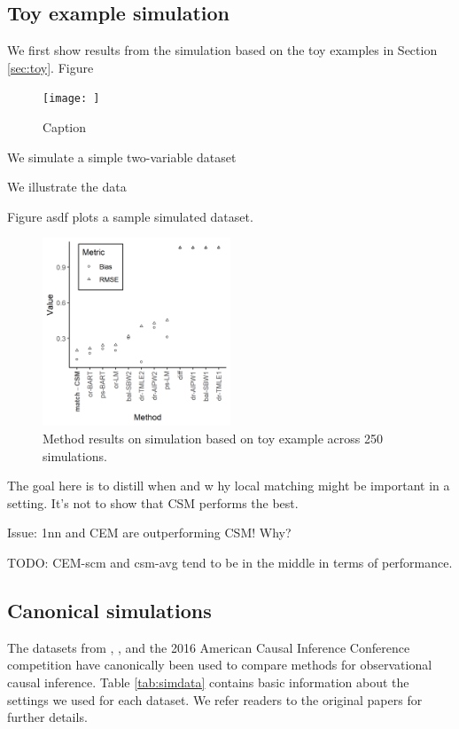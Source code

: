 \documentclass{article}
\begin{document}
\subsection{Toy example simulation}

We first show results from the simulation based on the toy examples in Section \ref{sec:toy}.
Figure 
\begin{figure}
    \centering
    \texttt{[image: ]}
    \caption{Caption}
    \label{fig:my_label}
\end{figure}

We simulate a simple two-variable dataset

We illustrate the data

Figure asdf plots a sample simulated dataset.

\begin{figure}
    \centering
    \includegraphics[width=0.5\textwidth]{writeup/figures/sim_toy_results.png}
    \caption{Method results on simulation based on toy example across 250 simulations.}
    \label{fig:sim_toy_results}
\end{figure}



The goal here is to distill when and w  hy local matching might be important in a setting.
It's not to show that CSM performs the best.

Issue: 1nn and CEM are outperforming CSM! Why?

TODO: CEM-scm and csm-avg tend to be in the middle in terms of performance.



\subsection{Canonical simulations}

The datasets from \citet{kang2007demystifying}, \citet{hainmueller2012entropy}, and the 2016 American Causal Inference Conference competition \citep{dorie2019automated} have canonically been used to compare methods for observational causal inference.
Table \ref{tab:simdata} contains basic information about the settings we used for each dataset.
We refer readers to the original papers for further details.
\end{document}
